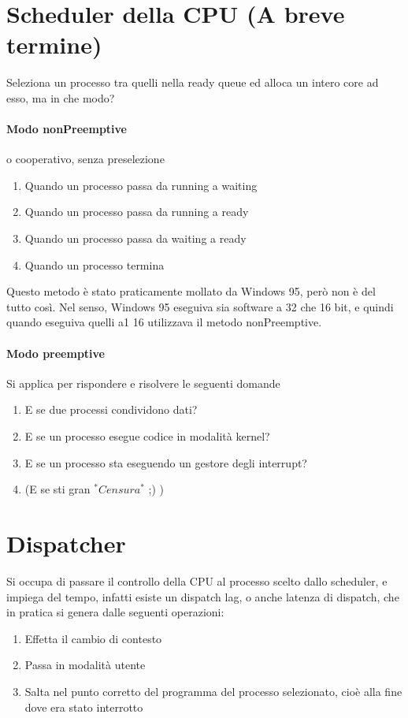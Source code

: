 \documentclass[12pt, a4paper, openany, twoside]{book}
\begin{document}
\section{Scheduler della CPU (A breve termine)}
Seleziona un processo tra quelli nella ready queue ed alloca un intero core ad 
esso, ma in che modo?
\paragraph{Modo nonPreemptive} o cooperativo, senza preselezione
\begin{enumerate}
	\item Quando un processo passa da running a waiting
	\item Quando un processo passa da running a ready
	\item Quando un processo passa da waiting a ready
	\item Quando un processo termina
\end{enumerate}
Questo metodo è stato praticamente mollato da Windows 95, però non è del tutto
così. Nel senso, Windows 95 eseguiva sia software a 32 che 16 bit, e quindi
quando eseguiva quelli a1 16 utilizzava il metodo nonPreemptive.  
\paragraph{Modo preemptive}
Si applica per rispondere e risolvere le seguenti domande
\begin{enumerate}
	\item E se due processi condividono dati?
	\item E se un processo esegue codice in modalità kernel?
	\item E se un processo sta eseguendo un gestore degli interrupt?
	\item (E se sti gran $^{*}Censura^{*}$ ;) )
\end{enumerate}
\section{Dispatcher}
Si occupa di passare il controllo della CPU al processo scelto dallo scheduler,
e impiega del tempo, infatti esiste un dispatch lag, o anche latenza di dispatch,
che in pratica si genera dalle seguenti operazioni:
\begin{enumerate}
	\item Effetta il cambio di contesto
	\item Passa in modalità utente
	\item Salta nel punto corretto del programma del processo selezionato, cioè
	alla fine dove era stato interrotto
\end{enumerate}
\end{document}

